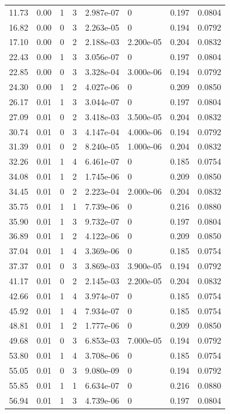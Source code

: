 \documentclass[preview]{standalone}
\begin{document}
{{\begin{tabular}{L{1.2cm}C{1.2cm} C{0.3cm}C{0.5cm} C{1.4cm}C{1.4cm} C{1.4cm}C{1.4cm}}
  11.73  &  0.00  & 1     &  3 &  2.987e-07  & 0  & 0.197 &  0.0804   \\ 
  16.82  &  0.00  & 0     &  3 &  2.263e-05  & 0  & 0.194 &  0.0792   \\ 
  17.10  &  0.00  & 0     &  2 &  2.188e-03  & 2.200e-05  & 0.204 &  0.0832   \\ 
  22.43  &  0.00  & 1     &  3 &  3.056e-07  & 0  & 0.197 &  0.0804   \\ 
  22.85  &  0.00  & 0     &  3 &  3.328e-04  & 3.000e-06  & 0.194 &  0.0792   \\ 
  24.30  &  0.00  & 1     &  2 &  4.027e-06  & 0  & 0.209 &  0.0850   \\ 
  26.17  &  0.01  & 1     &  3 &  3.044e-07  & 0  & 0.197 &  0.0804   \\ 
  27.09  &  0.01  & 0     &  2 &  3.418e-03  & 3.500e-05  & 0.204 &  0.0832   \\ 
  30.74  &  0.01  & 0     &  3 &  4.147e-04  & 4.000e-06  & 0.194 &  0.0792   \\ 
  31.39  &  0.01  & 0     &  2 &  8.240e-05  & 1.000e-06  & 0.204 &  0.0832   \\ 
  32.26  &  0.01  & 1     &  4 &  6.461e-07  & 0  & 0.185 &  0.0754   \\ 
  34.08  &  0.01  & 1     &  2 &  1.745e-06  & 0  & 0.209 &  0.0850   \\ 
  34.45  &  0.01  & 0     &  2 &  2.223e-04  & 2.000e-06  & 0.204 &  0.0832   \\ 
  35.75  &  0.01  & 1     &  1 &  7.739e-06  & 0  & 0.216 &  0.0880   \\ 
  35.90  &  0.01  & 1     &  3 &  9.732e-07  & 0  & 0.197 &  0.0804   \\ 
  36.89  &  0.01  & 1     &  2 &  4.122e-06  & 0  & 0.209 &  0.0850   \\ 
  37.04  &  0.01  & 1     &  4 &  3.369e-06  & 0  & 0.185 &  0.0754   \\ 
  37.37  &  0.01  & 0     &  3 &  3.869e-03  & 3.900e-05  & 0.194 &  0.0792   \\ 
  41.17  &  0.01  & 0     &  2 &  2.145e-03  & 2.200e-05  & 0.204 &  0.0832   \\ 
  42.66  &  0.01  & 1     &  4 &  3.974e-07  & 0  & 0.185 &  0.0754   \\ 
  45.92  &  0.01  & 1     &  4 &  7.934e-07  & 0  & 0.185 &  0.0754   \\ 
  48.81  &  0.01  & 1     &  2 &  1.777e-06  & 0  & 0.209 &  0.0850   \\ 
  49.68  &  0.01  & 0     &  3 &  6.853e-03  & 7.000e-05  & 0.194 &  0.0792   \\ 
  53.80  &  0.01  & 1     &  4 &  3.708e-06  & 0  & 0.185 &  0.0754   \\ 
  55.05  &  0.01  & 0     &  3 &  9.080e-09  & 0  & 0.194 &  0.0792   \\ 
  55.85  &  0.01  & 1     &  1 &  6.634e-07  & 0  & 0.216 &  0.0880   \\ 
  56.94  &  0.01  & 1     &  3 &  4.739e-06  & 0  & 0.197 &  0.0804   \\ 
\hline 
\end{tabular} 

}}
\end{document}
